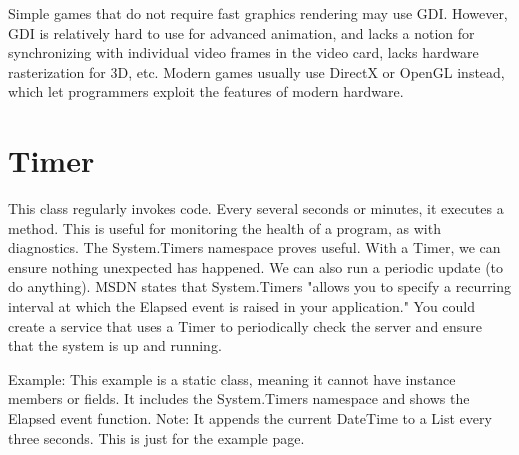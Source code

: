 Simple games that do not require fast graphics rendering may use GDI. However, GDI is relatively
hard to use for advanced animation, and lacks a notion for synchronizing with individual video
frames in the video card, lacks hardware rasterization for 3D, etc. Modern games usually use
DirectX or OpenGL instead, which let programmers exploit the features of modern hardware.

\section{Timer}
This class regularly invokes code. Every several seconds or minutes, it executes a method. This is
useful for monitoring the health of a program, as with diagnostics. The System.Timers namespace
proves useful. With a Timer, we can ensure nothing unexpected has happened. We can also run a
periodic update (to do anything). MSDN states that System.Timers "allows you to specify a
recurring interval at which the Elapsed event is raised in your application." You could create a
service that uses a Timer to periodically check the server and ensure that the system is up and
running.

Example:
This example is a static class, meaning it cannot have instance members or fields. It includes the
System.Timers namespace and shows the Elapsed event function.
Note: It appends the current DateTime to a List every three seconds. This is just for the example
page.





%
%
%
%
%

